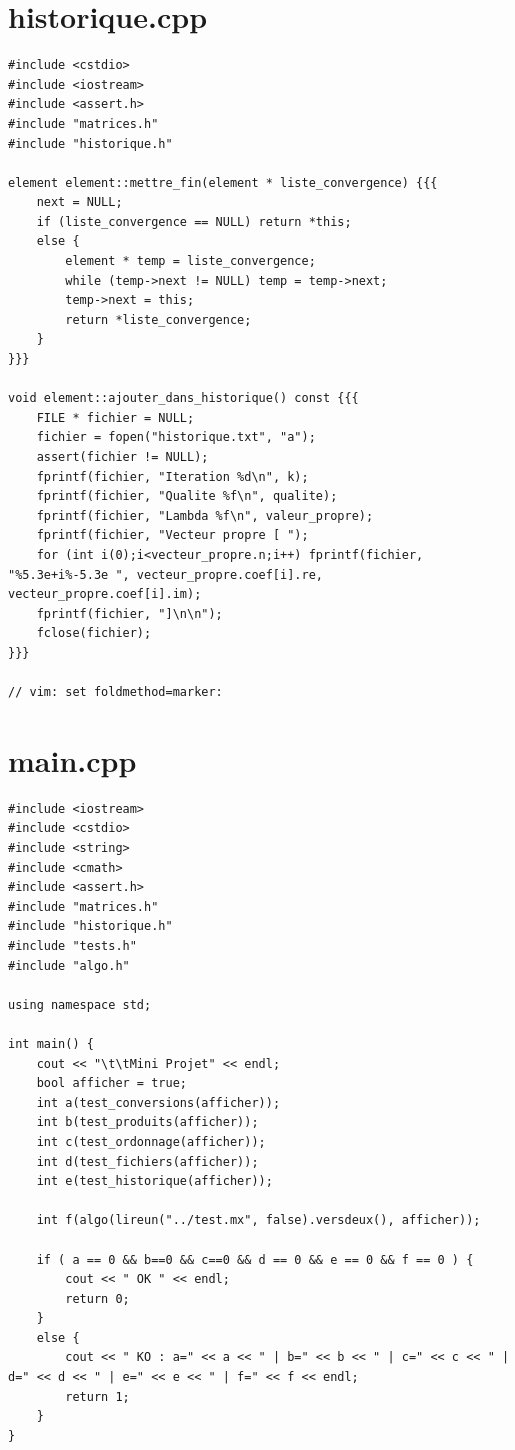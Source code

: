 \documentclass[a4paper]{article}
\begin{document}
\section{historique.cpp}
\begin{verbatim}
#include <cstdio>
#include <iostream>
#include <assert.h>
#include "matrices.h"
#include "historique.h"

element element::mettre_fin(element * liste_convergence) {{{
    next = NULL;
    if (liste_convergence == NULL) return *this;
    else {
        element * temp = liste_convergence;
        while (temp->next != NULL) temp = temp->next;
        temp->next = this;
        return *liste_convergence;
    }
}}}

void element::ajouter_dans_historique() const {{{
    FILE * fichier = NULL;
    fichier = fopen("historique.txt", "a");
    assert(fichier != NULL);
    fprintf(fichier, "Iteration %d\n", k);
    fprintf(fichier, "Qualite %f\n", qualite);
    fprintf(fichier, "Lambda %f\n", valeur_propre);
    fprintf(fichier, "Vecteur propre [ ");
    for (int i(0);i<vecteur_propre.n;i++) fprintf(fichier, "%5.3e+i%-5.3e ", vecteur_propre.coef[i].re, vecteur_propre.coef[i].im);
    fprintf(fichier, "]\n\n");
    fclose(fichier);
}}}

// vim: set foldmethod=marker:
\end{verbatim}

\section{main.cpp}
\begin{verbatim}
#include <iostream>
#include <cstdio>
#include <string>
#include <cmath>
#include <assert.h>
#include "matrices.h"
#include "historique.h"
#include "tests.h"
#include "algo.h"

using namespace std;

int main() {
    cout << "\t\tMini Projet" << endl;
    bool afficher = true;
    int a(test_conversions(afficher));
    int b(test_produits(afficher));
    int c(test_ordonnage(afficher));
    int d(test_fichiers(afficher));
    int e(test_historique(afficher));

    int f(algo(lireun("../test.mx", false).versdeux(), afficher));
    
    if ( a == 0 && b==0 && c==0 && d == 0 && e == 0 && f == 0 ) {
        cout << " OK " << endl;
        return 0;
    }
    else {
        cout << " KO : a=" << a << " | b=" << b << " | c=" << c << " | d=" << d << " | e=" << e << " | f=" << f << endl; 
        return 1;
    }
}
\end{verbatim}
\end{document}
